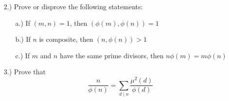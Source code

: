 \documentclass[12pt]{article}
\begin{document}
\begin{itemize}
\begin{itemize}
        \end{itemize}

        \item [2.)] Prove or disprove the following statements:
        \begin{itemize}
            \item [a.)] If \( (m, n) = 1 \), then
            \( (\phi(m), \phi(n)) = 1 \)

            \item [b.)] If \( n \) is composite, then \( (n, \phi(n)) > 1 \)
            
            \item [c.)] If \( m \) and \( n \) have the same prime divisors,
            then \( n\phi(m) = m\phi(n) \)
        \end{itemize}

        \item [3.)] Prove that
        \[
            \frac{n}{\phi(n)}
            = \sum_{d \mid n} \frac{\mu^2(d)}{\phi(d)}
        \]
    \end{itemize}
\end{document}
